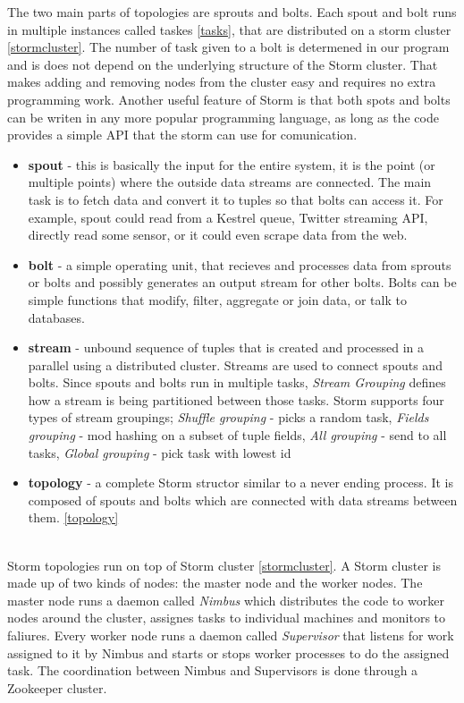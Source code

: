 \documentclass[journal]{IEEEtran/IEEEtran}
\begin{document}
The two main parts of topologies are sprouts and bolts. Each spout and bolt runs in multiple instances called taskes \ref{tasks}, that are distributed on a storm cluster \ref{stormcluster}. The number of task given to a bolt is determened in our program and is does not depend on the underlying structure of the Storm cluster. That makes adding and removing nodes from the cluster easy and requires no extra programming work. Another useful feature of Storm is that both spots and bolts can be writen in any more popular programming language, as long as the code provides a simple API that the storm can use for comunication. \\

\begin{itemize}
    \item \textbf{spout} - this is basically the input for the entire system, it is the point (or multiple points) where the outside data streams are connected. The main task is to fetch data and convert it to tuples so that bolts can access it. For example, spout could read from a Kestrel queue, Twitter streaming API, directly read some sensor, or it could even scrape data from the web.
    \item \textbf{bolt} - a simple operating unit, that recieves and processes data from sprouts or bolts and possibly generates an output stream for other bolts. Bolts can be simple functions that modify, filter, aggregate or join data, or talk to databases. 
    \item \textbf{stream} - unbound sequence of tuples that is created and processed in a parallel using a distributed cluster. Streams are used to connect spouts and bolts. Since spouts and bolts run in multiple tasks, \textit{Stream Grouping} defines how a stream is being partitioned between those tasks. Storm supports four types of stream groupings; \textit{Shuffle grouping} - picks a random task, \textit{Fields grouping} - mod hashing on a subset of tuple fields, \textit{All grouping} - send to all tasks, \textit{Global grouping} - pick task with lowest id
    \item \textbf{topology} - a complete Storm structor similar to a never ending process. It is composed of spouts and bolts which are connected with data streams between them. \ref{topology}
\end{itemize} 
\ \\

Storm topologies run on top of Storm cluster \ref{stormcluster}. A Storm cluster is made up of two kinds of nodes: the master node and the worker nodes. The master node runs a daemon called \textit{Nimbus} which distributes the code to worker nodes around the cluster, assignes tasks to individual machines and monitors to faliures. Every worker node runs a daemon called \textit{Supervisor} that listens for work assigned to it by Nimbus and starts or stops worker processes to do the assigned task. The coordination between Nimbus and Supervisors is done through a Zookeeper cluster.
\end{document}
